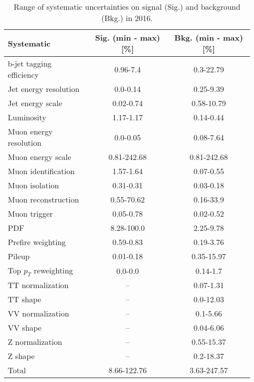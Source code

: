 \begin{table}[htbp]
\begin{center}
\caption{Range of systematic uncertainties on signal (Sig.) and background (Bkg.) in 2016.}
\begin{tabular}{lcc}
\hline\hline
Systematic				&  Sig. (min - max) [\%] &  Bkg. (min - max) [\%]  \\ \hline
b-jet tagging efficiency	& 0.96-7.4 & 0.3-22.79 \\
Jet energy resolution  	& 0.0-0.14 & 0.25-9.39 \\
Jet energy scale       	& 0.02-0.74 & 0.58-10.79 \\
Luminosity		 		& 1.17-1.17 & 0.14-0.44 \\
Muon energy resolution 	& 0.0-0.05 & 0.08-7.64 \\
Muon energy scale			& 0.81-242.68 & 0.81-242.68 \\
Muon identification		& 1.57-1.64 & 0.07-0.55 \\
Muon isolation			& 0.31-0.31 & 0.03-0.18 \\
Muon reconstruction		& 0.55-70.62 & 0.16-33.9 \\
Muon trigger				& 0.05-0.78 & 0.02-0.52 \\
PDF                    	& 8.28-100.0 & 2.25-9.78 \\
Prefire weighting			& 0.59-0.83 & 0.19-3.76 \\
Pileup                	& 0.01-0.18 & 0.35-15.97 \\
Top $p_T$ reweighting     & 0.0-0.0 & 0.14-1.7 \\
TT normalization       	& -- & 0.07-1.31 \\
TT shape               	& -- & 0.0-12.03 \\
VV normalization      	& -- & 0.1-5.66 \\
VV shape          		& -- & 0.04-6.06 \\
Z normalization        	& -- & 0.55-15.37 \\
Z shape                	& -- & 0.2-18.37 \\
Total                 	& 8.66-122.76 & 3.63-247.57 \\ \hline\hline
\end{tabular}
\label{tab:SysRanges2016}
\end{center}
\end{table}

